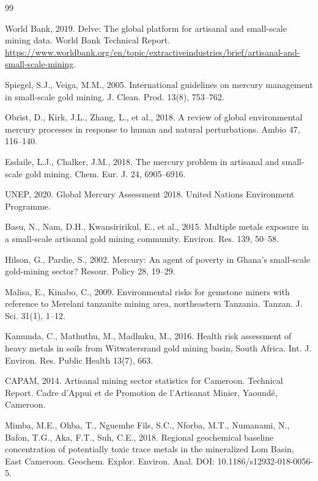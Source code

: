 \documentclass[preprint,12pt,authoryear]{elsarticle}
\begin{document}
\begin{thebibliography}{99}

World Bank, 2019. Delve: The global platform for artisanal and small-scale mining data. World Bank Technical Report. \url{https://www.worldbank.org/en/topic/extractiveindustries/brief/artisanal-and-small-scale-mining}.

Spiegel, S.J., Veiga, M.M., 2005. International guidelines on mercury management in small-scale gold mining. J. Clean. Prod. 13(8), 753--762.

Obrist, D., Kirk, J.L., Zhang, L., et al., 2018. A review of global environmental mercury processes in response to human and natural perturbations. Ambio 47, 116--140.

Esdaile, L.J., Chalker, J.M., 2018. The mercury problem in artisanal and small-scale gold mining. Chem. Eur. J. 24, 6905--6916.

UNEP, 2020. Global Mercury Assessment 2018. United Nations Environment Programme.

Basu, N., Nam, D.H., Kwansiririkul, E., et al., 2015. Multiple metals exposure in a small-scale artisanal gold mining community. Environ. Res. 139, 50--58.

Hilson, G., Pardie, S., 2002. Mercury: An agent of poverty in Ghana's small-scale gold-mining sector? Resour. Policy 28, 19--29.

Malisa, E., Kinabo, C., 2009. Environmental risks for gemstone miners with reference to Merelani tanzanite mining area, northeastern Tanzania. Tanzan. J. Sci. 31(1), 1--12.

Kamunda, C., Mathuthu, M., Madhuku, M., 2016. Health risk assessment of heavy metals in soils from Witwatersrand gold mining basin, South Africa. Int. J. Environ. Res. Public Health 13(7), 663.

CAPAM, 2014. Artisanal mining sector statistics for Cameroon. Technical Report. Cadre d'Appui et de Promotion de l'Artisanat Minier, Yaound\'{e}, Cameroon.

Mimba, M.E., Ohba, T., Nguemhe Fils, S.C., Nforba, M.T., Numanami, N., Bafon, T.G., Aka, F.T., Suh, C.E., 2018. Regional geochemical baseline concentration of potentially toxic trace metals in the mineralized Lom Basin, East Cameroon. Geochem. Explor. Environ. Anal. DOI: 10.1186/s12932-018-0056-5.


\end{thebibliography}
\end{document}
